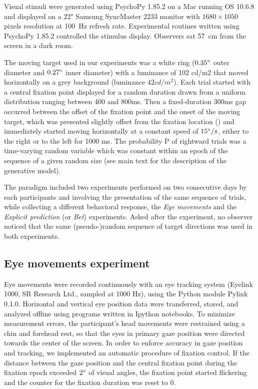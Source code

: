 \documentclass[12pt,english]{article}%
\newcommand{\citet}[1]{\textcite{#1}}
\begin{document}
Visual stimuli were generated using PsychoPy 1.85.2 on a Mac running OS 10.6.8 and displayed on a 22" Samsung SyncMaster 2233 monitor with $1680\times 1050$ pixels resolution at 100~\si{\Hz} refresh rate. Experimental routines written using PsychoPy 1.85.2 controlled the stimulus display. Observers sat 57~\si{\cm} from the screen in a dark room.

The moving target used in our experiments was a white ring ($0.35\degree$ outer diameter and $0.27\degree$ inner diameter) with a luminance of 102 cd/m2 that moved horizontally on a grey background (luminance $42cd/m^2$). Each trial started with a central fixation point displayed for a random duration drawn from a uniform distribution ranging between 400 and 800ms. Then a fixed-duration 300ms gap occurred between the offset of the fixation point and the onset of the moving target, which was presented slightly offset from the fixation location (\citet{Rashbass1961}) and immediately started moving horizontally at a constant speed of $15\degree/s$, either to the right or to the left for 1000 ms. The probability P of rightward trials was a time-varying random variable which was constant within an epoch of the sequence of a given random size (see main text for the description of the generative model).

The paradigm included two experiments performed on two consecutive days by each participants and involving the presentation of the same sequence of trials, while collecting a different behavioral response, the \textit{Eye movements} and the \textit{Explicit prediction} (or \textit{Bet}) experiments. Asked after the experiment, no observer noticed that the same (pseudo-)random sequence of target directions was used in both experiments.

\subsection{Eye movements experiment}
Eye movements were recorded continuously with an eye tracking system (Eyelink 1000, SR Research Ltd., sampled at 1000 Hz), using the Python module Pylink 0.1.0. Horizontal and vertical eye position data were transferred, stored, and analyzed offline using programs written in Ipython notebooks.
To minimize measurement errors, the participant's head movements were restrained using a chin and forehead rest, so that the eyes in primary gaze position were directed towards the center of the screen. In order to enforce accuracy in gaze position and tracking, we implemented an automatic procedure of fixation control. If the distance between the gaze position and the central fixation point during the fixation epoch exceeded $2\degree$ of visual angles, the fixation point started flickering and the counter for the fixation duration was reset to $0$.
\end{document}
